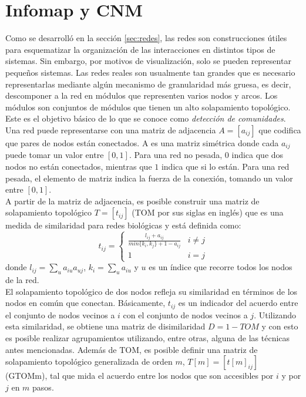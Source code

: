 \section{Infomap y CNM}
Como se desarrolló en la sección \ref{sec:redes}, las redes son construcciones útiles para esquematizar la organización de las interacciones en distintos tipos de sistemas. Sin embargo, por motivos de visualización, solo se pueden representar pequeños sistemas. Las redes reales son usualmente tan grandes que es necesario representarlas mediante algún mecanismo de granularidad más gruesa, es decir, descomponer a la red en módulos que representen varios nodos y arcos. Los módulos son conjuntos de módulos que tienen un alto solapamiento topológico. Este es el objetivo básico de lo que se conoce como \textit{detección de comunidades}.\\
Una red puede representarse con una matriz de adjacencia $A=[a_{ij}]$ que codifica que pares de nodos están conectados. A es una matriz simétrica donde cada $a_{ij}$ puede tomar un valor entre $[0, 1]$. Para una red no pesada, $0$ indica que dos nodos no están conectados, mientras que $1$ indica que si lo están. Para una red pesada, el elemento de matriz indica la fuerza de la conexión, tomando un valor entre $[0, 1]$.\\
A partir de la matriz de adjacencia, es posible construir una matriz de solapamiento topológico $T = [t_{ij}]$ (TOM por sus siglas en inglés) que es una medida de similaridad para redes biológicas y está definida como:
\begin{equation}
t_{ij} = \begin{cases} 
      \frac{l_{ij}+a_{ij}}{min\{k_i,k_j\}+1-a_{ij}} & i\neq j \\
      1 & i=j 
\end{cases}
\end{equation}
donde $l_{ij} = \sum\limits_u a_{iu}a_{uj}$, $k_i = \sum\limits_u a_{iu}$ y $u$ es un índice que recorre todos los nodos de la red.\\
El solapamiento topológico de dos nodos refleja su similaridad en términos de los nodos en común que conectan. Básicamente, $t_{ij}$ es un indicador del acuerdo entre el conjunto de nodos vecinos a $i$ con el conjunto de nodos vecinos a $j$. Utilizando esta similaridad, se obtiene una matriz de disimilaridad $D = 1-TOM$ y con esto es posible realizar agrupamientos utilizando, entre otras, alguna de las técnicas antes mencionadas. Además de TOM, es posible definir una matriz de solapamiento topológico generalizada de orden $m$, $T[m] = [t[m]_{ij}]$ (GTOMm), tal que mida el acuerdo entre los nodos que son accesibles por $i$ y por $j$ en $m$ pasos.\cite{Horvath2007}\\
